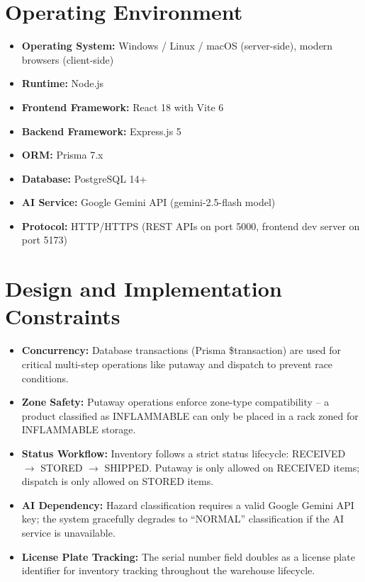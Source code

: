 \documentclass[12pt,a4paper]{report}
\begin{document}
\section{Operating Environment}
\begin{itemize}
    \item \textbf{Operating System:} Windows / Linux / macOS (server-side), modern browsers (client-side)
    \item \textbf{Runtime:} Node.js
    \item \textbf{Frontend Framework:} React 18 with Vite 6
    \item \textbf{Backend Framework:} Express.js 5
    \item \textbf{ORM:} Prisma 7.x
    \item \textbf{Database:} PostgreSQL 14+
    \item \textbf{AI Service:} Google Gemini API (gemini-2.5-flash model)
    \item \textbf{Protocol:} HTTP/HTTPS (REST APIs on port 5000, frontend dev server on port 5173)
\end{itemize}

\section{Design and Implementation Constraints}
\begin{itemize}
    \item \textbf{Concurrency:} Database transactions (Prisma \$transaction) are used for critical multi-step operations like putaway and dispatch to prevent race conditions.
    \item \textbf{Zone Safety:} Putaway operations enforce zone-type compatibility -- a product classified as INFLAMMABLE can only be placed in a rack zoned for INFLAMMABLE storage.
    \item \textbf{Status Workflow:} Inventory follows a strict status lifecycle: RECEIVED $\rightarrow$ STORED $\rightarrow$ SHIPPED. Putaway is only allowed on RECEIVED items; dispatch is only allowed on STORED items.
    \item \textbf{AI Dependency:} Hazard classification requires a valid Google Gemini API key; the system gracefully degrades to ``NORMAL'' classification if the AI service is unavailable.
    \item \textbf{License Plate Tracking:} The serial number field doubles as a license plate identifier for inventory tracking throughout the warehouse lifecycle.
\end{itemize}
\end{document}
